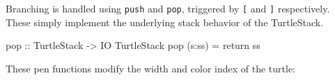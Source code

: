 \documentclass[]{article}
\newenvironment{Shaded}{}{}
\newcommand{\DataTypeTok}[1]{\textcolor[rgb]{0.56,0.13,0.00}{{#1}}}
\newcommand{\DecValTok}[1]{\textcolor[rgb]{0.25,0.63,0.44}{{#1}}}
\newcommand{\OtherTok}[1]{\textcolor[rgb]{0.00,0.44,0.13}{{#1}}}
\newcommand{\FunctionTok}[1]{\textcolor[rgb]{0.02,0.16,0.49}{{#1}}}
\newcommand{\NormalTok}[1]{{#1}}
\begin{document}
\begin{Shaded}
\end{Shaded}
Branching is handled using \texttt{push} and \texttt{pop}, triggered by
\texttt{{[}} and \texttt{{]}} respectively. These simply implement the
underlying stack behavior of the TurtleStack.

\begin{Shaded}
\end{Shaded}
\begin{Shaded}
\begin{Highlighting}[]
\OtherTok{pop                                  ::} \DataTypeTok{TurtleStack} \OtherTok{->} \DataTypeTok{IO} \DataTypeTok{TurtleStack}
\NormalTok{pop (s}\FunctionTok{:}\NormalTok{ss)                            }\FunctionTok{=} \FunctionTok{return} \NormalTok{ss}
\end{Highlighting}
\end{Shaded}
These pen functions modify the width and color index of the turtle:
\end{document}

